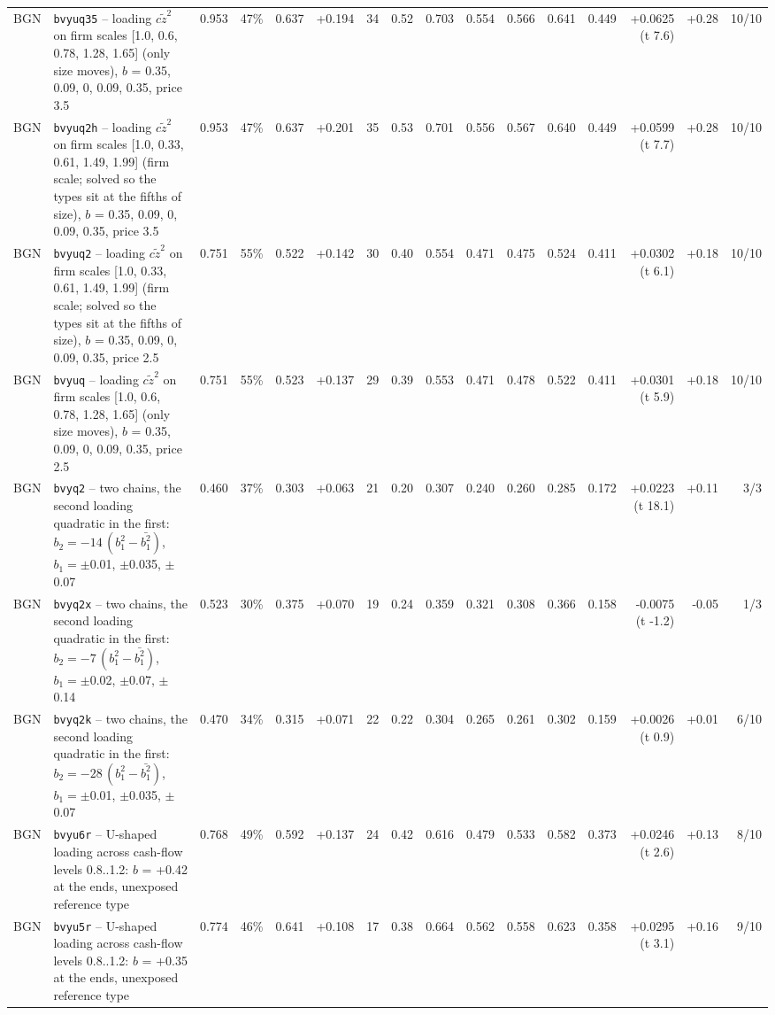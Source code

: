 \begin{landscape}
\begin{longtable}{lp{4.6cm}rrrrrrrrrrrrrr}
BGN & \texttt{bvyuq35} -- loading $c\tilde z^2$ on firm scales [1.0, 0.6, 0.78, 1.28, 1.65] (only size moves), $b$ = 0.35, 0.09, 0, 0.09, 0.35, price 3.5 & 0.953 & 47\% & 0.637 & +0.194 & 34 & 0.52 & 0.703 & 0.554 & 0.566 & 0.641 & 0.449 & +0.0625 (t 7.6) & +0.28 & 10/10 \\
BGN & \texttt{bvyuq2h} -- loading $c\tilde z^2$ on firm scales [1.0, 0.33, 0.61, 1.49, 1.99] (firm scale; solved so the types sit at the fifths of size), $b$ = 0.35, 0.09, 0, 0.09, 0.35, price 3.5 & 0.953 & 47\% & 0.637 & +0.201 & 35 & 0.53 & 0.701 & 0.556 & 0.567 & 0.640 & 0.449 & +0.0599 (t 7.7) & +0.28 & 10/10 \\
BGN & \texttt{bvyuq2} -- loading $c\tilde z^2$ on firm scales [1.0, 0.33, 0.61, 1.49, 1.99] (firm scale; solved so the types sit at the fifths of size), $b$ = 0.35, 0.09, 0, 0.09, 0.35, price 2.5 & 0.751 & 55\% & 0.522 & +0.142 & 30 & 0.40 & 0.554 & 0.471 & 0.475 & 0.524 & 0.411 & +0.0302 (t 6.1) & +0.18 & 10/10 \\
BGN & \texttt{bvyuq} -- loading $c\tilde z^2$ on firm scales [1.0, 0.6, 0.78, 1.28, 1.65] (only size moves), $b$ = 0.35, 0.09, 0, 0.09, 0.35, price 2.5 & 0.751 & 55\% & 0.523 & +0.137 & 29 & 0.39 & 0.553 & 0.471 & 0.478 & 0.522 & 0.411 & +0.0301 (t 5.9) & +0.18 & 10/10 \\
BGN & \texttt{bvyq2} -- two chains, the second loading quadratic in the first: $b_2 = -14\,(b_1^2 - \bar{b_1^2})$, $b_1 = \pm$0.01, $\pm$0.035, $\pm$0.07 & 0.460 & 37\% & 0.303 & +0.063 & 21 & 0.20 & 0.307 & 0.240 & 0.260 & 0.285 & 0.172 & +0.0223 (t 18.1) & +0.11 & 3/3 \\
BGN & \texttt{bvyq2x} -- two chains, the second loading quadratic in the first: $b_2 = -7\,(b_1^2 - \bar{b_1^2})$, $b_1 = \pm$0.02, $\pm$0.07, $\pm$0.14 & 0.523 & 30\% & 0.375 & +0.070 & 19 & 0.24 & 0.359 & 0.321 & 0.308 & 0.366 & 0.158 & -0.0075 (t -1.2) & -0.05 & 1/3 \\
BGN & \texttt{bvyq2k} -- two chains, the second loading quadratic in the first: $b_2 = -28\,(b_1^2 - \bar{b_1^2})$, $b_1 = \pm$0.01, $\pm$0.035, $\pm$0.07 & 0.470 & 34\% & 0.315 & +0.071 & 22 & 0.22 & 0.304 & 0.265 & 0.261 & 0.302 & 0.159 & +0.0026 (t 0.9) & +0.01 & 6/10 \\
BGN & \texttt{bvyu6r} -- U-shaped loading across cash-flow levels 0.8..1.2: $b$ = +0.42 at the ends, unexposed reference type & 0.768 & 49\% & 0.592 & +0.137 & 24 & 0.42 & 0.616 & 0.479 & 0.533 & 0.582 & 0.373 & +0.0246 (t 2.6) & +0.13 & 8/10 \\
BGN & \texttt{bvyu5r} -- U-shaped loading across cash-flow levels 0.8..1.2: $b$ = +0.35 at the ends, unexposed reference type & 0.774 & 46\% & 0.641 & +0.108 & 17 & 0.38 & 0.664 & 0.562 & 0.558 & 0.623 & 0.358 & +0.0295 (t 3.1) & +0.16 & 9/10 \\

\end{longtable}
\end{landscape}
